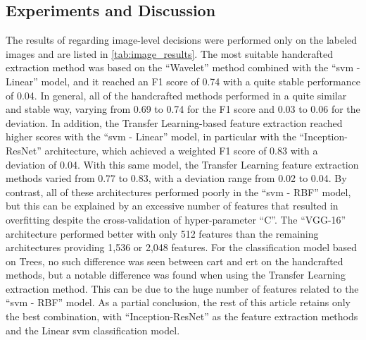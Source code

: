 \documentclass[journal,article,submit,moreauthors,pdftex, applsci]{Definitions/mdpi}
\begin{document}
\subsection{Experiments and Discussion}
The results of  regarding image-level decisions were performed only on the labeled images and are listed in \cref{tab:image_results}. The most suitable handcrafted extraction method was based on the “Wavelet” method combined with the “\ac{svm} - Linear” model, and it reached an F1 score of 0.74 with a quite stable performance of 0.04. In general, all of the handcrafted methods performed in a quite similar and stable way, varying from 0.69 to 0.74 for the F1 score and 0.03 to 0.06 for the deviation. In addition, the Transfer Learning-based feature extraction reached higher scores with the “\ac{svm} - Linear” model, in particular with the “Inception-ResNet” architecture, which achieved a weighted F1 score of 0.83 with a deviation of 0.04. With this same model, the Transfer Learning feature extraction methods varied from 0.77 to 0.83, with a deviation range from 0.02 to 0.04. By contrast, all of these architectures performed poorly in the “\ac{svm} - RBF” model, but this can be explained by an excessive number of features that resulted in overfitting despite the cross-validation of hyper-parameter “C”. The “VGG-16” architecture performed better with only 512 features than the remaining architectures providing 1,536 or 2,048 features. For the classification model based on Trees, no such difference was seen between \ac{cart} and \ac{ert} on the handcrafted methods, but a notable difference was found when using the Transfer Learning extraction method. This can be due to the huge number of features related to the “\ac{svm} - RBF” model. As a partial conclusion, the rest of this article retains only the best combination, with “Inception-ResNet” as the feature extraction methods and the Linear \ac{svm} classification model.\par
\end{document}
